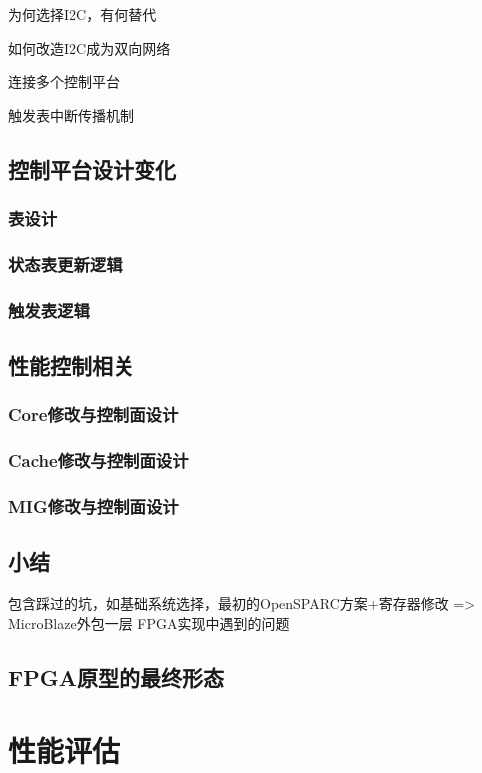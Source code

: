 为何选择I2C，有何替代

如何改造I2C成为双向网络

连接多个控制平台

触发表中断传播机制


\subsection{控制平台设计变化}

\subsubsection*{表设计}
\subsubsection*{状态表更新逻辑}
\subsubsection*{触发表逻辑}


\subsection{性能控制相关}
\subsubsection*{Core修改与控制面设计}
\subsubsection*{Cache修改与控制面设计}
\subsubsection*{MIG修改与控制面设计}

\subsection{小结}
包含踩过的坑，如基础系统选择，最初的OpenSPARC方案+寄存器修改 => MicroBlaze外包一层
FPGA实现中遇到的问题

\subsection{FPGA原型的最终形态}


\section{性能评估}


